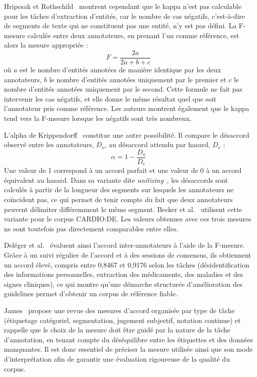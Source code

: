 Hripcsak et Rothschild~\cite{hripcsak2005agreement} montrent cependant que le kappa n'est pas calculable pour les tâches d'extraction d'entités, car le nombre de cas négatifs, c'est-à-dire de segments de texte qui ne constituent pas une entité, n'y est pas défini. La F-mesure calculée entre deux annotateurs, en prenant l'un comme référence, est alors la mesure appropriée :
\begin{equation}
F = \frac{2a}{2a + b + c}
\label{eq:fmesure}
\end{equation}
où $a$ est le nombre d'entités annotées de manière identique par les deux annotateurs, $b$ le nombre d'entités annotées uniquement par le premier et $c$ le nombre d'entités annotées uniquement par le second. Cette formule ne fait pas intervenir les cas négatifs, et elle donne le même résultat quel que soit l'annotateur pris comme référence. Les auteurs montrent également que le kappa tend vers la F-mesure lorsque les négatifs sont très nombreux.

L'alpha de Krippendorff~\cite{krippendorff2004content} constitue une autre possibilité. Il compare le désaccord observé entre les annotateurs, $D_o$, au désaccord attendu par hasard, $D_e$ :
\begin{equation}
\alpha = 1 - \frac{D_o}{D_e}
\label{eq:alpha}
\end{equation}
Une valeur de 1 correspond à un accord parfait et une valeur de 0 à un accord équivalent au hasard. Dans sa variante dite \textit{unitizing}~\cite{krippendorff1995unitizing}, les désaccords sont calculés à partir de la longueur des segments sur lesquels les annotateurs ne coïncident pas, ce qui permet de tenir compte du fait que deux annotateurs peuvent délimiter différemment le même segment. Becker et al.~\cite{becker2025cardio} utilisent cette variante pour le corpus CARDIO:DE. Les valeurs obtenues avec ces trois mesures ne sont toutefois pas directement comparables entre elles.

Deléger et al.~\cite{deleger2012building} évaluent ainsi l'accord inter-annotateurs à l'aide de la F-mesure. Grâce à un suivi régulier de l'accord et à des sessions de consensus, ils obtiennent un accord élevé, compris entre 0,8467 et 0,9176 selon les tâches (désidentification des informations personnelles, extraction des médicaments, des maladies et des signes cliniques), ce qui montre qu'une démarche structurée d'amélioration des guidelines permet d'obtenir un corpus de référence fiable.

James~\cite{james2026consensus} propose une revue des mesures d'accord organisée par type de tâche (étiquetage catégoriel, segmentation, jugement subjectif, notation continue) et rappelle que le choix de la mesure doit être guidé par la nature de la tâche d'annotation, en tenant compte du déséquilibre entre les étiquettes et des données manquantes. Il est donc essentiel de préciser la mesure utilisée ainsi que son mode d'interprétation afin de garantir une évaluation rigoureuse de la qualité du corpus.

